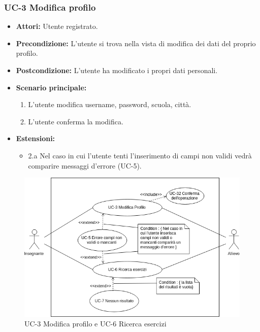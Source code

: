\subsubsection{UC-3 Modifica profilo}
		\begin{itemize}
			\item \textbf{Attori:} Utente registrato. 
			\item \textbf{Precondizione:} L'utente si trova nella vista di modifica dei dati del proprio profilo.
			\item \textbf{Postcondizione:} L'utente ha modificato i propri dati personali.
			\item \textbf{Scenario principale:}
				\begin{enumerate}
					\item L'utente modifica username, password, scuola, città.
					\item L'utente conferma la modifica. 
				\end{enumerate}
				\item \textbf{Estensioni:}
				\begin{itemize}
					\item 2.a Nel caso in cui l'utente tenti l'inserimento di campi non validi vedrà comparire messaggi d'errore (UC-5).
			
				\end{itemize}
		\end{itemize}
		\begin{figure}[htbp]
		\centering
		\includegraphics[scale=0.7]{images/UC-3.png}
		\caption{UC-3 Modifica profilo e UC-6 Ricerca esercizi}
	\end{figure}
	

